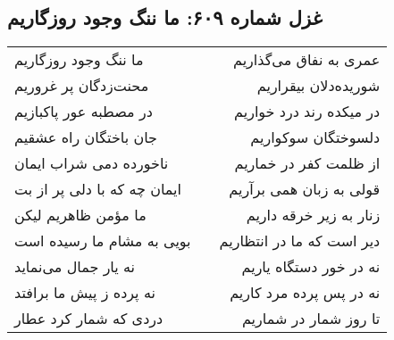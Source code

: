 \begin{center}
\section*{غزل شماره ۶۰۹: ما ننگ وجود روزگاریم}
\label{sec:609}
\begin{longtable}{l p{0.5cm} r}
ما ننگ وجود روزگاریم
&&
عمری به نفاق می‌گذاریم
\\
محنت‌زدگان پر غروریم
&&
شوریده‌دلان بیقراریم
\\
در مصطبه عور پاکبازیم
&&
در میکده رند درد خواریم
\\
جان باختگان راه عشقیم
&&
دلسوختگان سوکواریم
\\
ناخورده دمی شراب ایمان
&&
از ظلمت کفر در خماریم
\\
ایمان چه که با دلی پر از بت
&&
قولی به زبان همی برآریم
\\
ما مؤمن ظاهریم لیکن
&&
زنار به زیر خرقه داریم
\\
بویی به مشام ما رسیده است
&&
دیر است که ما در انتظاریم
\\
نه یار جمال می‌نماید
&&
نه در خور دستگاه یاریم
\\
نه پرده ز پیش ما برافتد
&&
نه در پس پرده مرد کاریم
\\
دردی که شمار کرد عطار
&&
تا روز شمار در شماریم
\\
\end{longtable}
\end{center}
